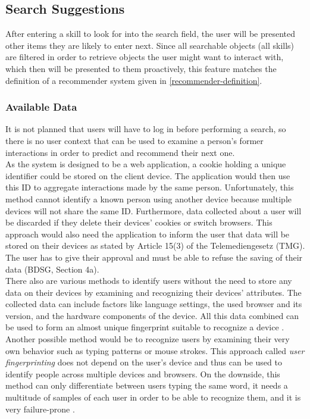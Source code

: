 \newpage

\subsection{Search Suggestions}
\label{autocomplete}
After entering a skill to look for into the search field, the user will be presented other items they are likely to enter next. Since all searchable objects (all skills) are filtered in order to retrieve objects the user might want to interact with, which then will be presented to them proactively, this feature matches the definition of a recommender system given in \ref{recommender-definition}.

\subsubsection{Available Data}
It is not planned that users will have to log in before performing a search, so
there is no user context that can be used to examine a person's former interactions
in order to predict and recommend their next one.\\
As the system is designed to be a web application, a cookie holding a unique identifier could be stored on the client device. The application would then use this ID to aggregate interactions made by the same person. Unfortunately, this method cannot identify a known person using another device because multiple devices will not share the same ID. Furthermore, data collected about a user will be discarded if they delete their devices' cookies or switch browsers.
This approach would also need the application to inform the user that data will be stored on their devices as stated by Article 15(3) of the Telemediengesetz (TMG). The user has to give their approval and must be able to refuse the saving of their data (BDSG, Section 4a).\\
There also are various methods to identify users without the need to store any data on their devices by examining and recognizing their devices' attributes. The collected data can include
factors like language settings, the used browser and its version, and the hardware components of the device. All this data combined can be used to form an almost unique fingerprint suitable to recognize a device \cite{finger}.\\
Another possible method would be to recognize users by examining their very own behavior such as typing patterns or mouse strokes. This approach called \textit{user fingerprinting} does not depend on the user's device and thus can be used to identify people across multiple devices and browsers. On the downside, this method can only differentiate between users typing the same word, it needs a multitude of samples of each user in order to be able to recognize them, and it is very failure-prone \cite{typing}.
